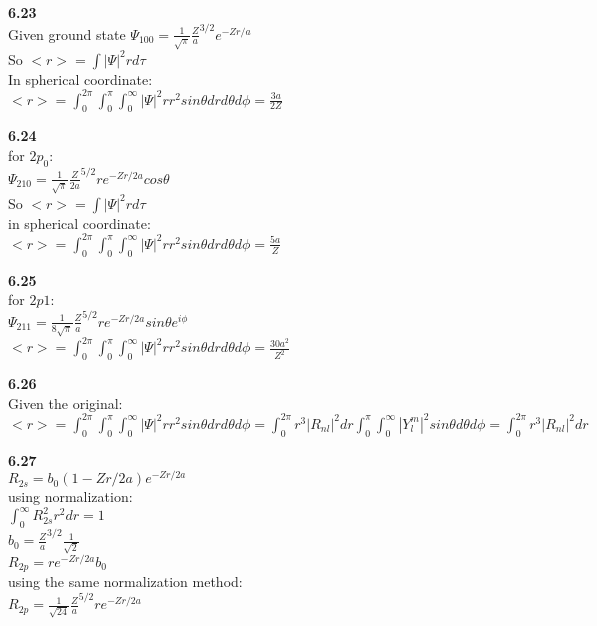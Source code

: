 \documentclass{article}
\begin{document}
\textbf{6.23}\\
Given ground state $\Psi_{100} = \frac{1}{\sqrt{\pi}}\frac{Z}{a}^{3/2}e^{-Zr/a}$\\
So $<r> = \int |\Psi|^2rd\tau$\\
In spherical coordinate:\\
$<r>=\int_0^{2\pi}\int_0^{\pi}\int_0^{\infty}|\Psi|^2rr^2sin\theta dr d\theta d\phi = \frac{3a}{2Z}$\\
\newline

\textbf{6.24}\\
for $2p_0$:\\
$\Psi_{210} = \frac{1}{\sqrt{\pi}}\frac{Z}{2a}^{5/2}re^{-Zr/2a}cos\theta$\\
So $<r> = \int |\Psi|^2r d\tau$\\
in spherical coordinate:\\
$<r>=\int_0^{2\pi}\int_0^{\pi}\int_0^{\infty}|\Psi|^2rr^2sin\theta dr d\theta d\phi = \frac{5a}{Z}$\\
\newline

\textbf{6.25}\\
for $2p1$:\\
$\Psi_{211} = \frac{1}{8\sqrt{\pi}}\frac{Z}{a}^{5/2}re^{-Zr/2a}sin\theta e^{i\phi}$\\
$<r>=\int_0^{2\pi}\int_0^{\pi}\int_0^{\infty}|\Psi|^2rr^2sin\theta dr d\theta d\phi = \frac{30a^2}{Z^2}$\\
\newline

\textbf{6.26}\\
Given the original:\\
$<r> = \int_0^{2\pi}\int_0^{\pi}\int_0^{\infty}|\Psi|^2rr^2sin\theta dr d\theta d\phi = \int_0^{2\pi} r^3|R_{nl}|^2dr\int_0^{\pi}\int_0^{\infty}|Y^m_l|^2sin\theta d\theta d\phi = \int_0^{2\pi} r^3|R_{nl}|^2dr$\\
\newline

\textbf{6.27}\\
$R_{2s} = b_0(1-Zr/2a)e^{-Zr/2a}$\\
using normalization:\\
$\int_0^{\infty}R_{2s}^2r^2dr = 1$\\
$b_0 = \frac{Z}{a}^{3/2}\frac{1}{\sqrt{2}}$\\
$R_{2p} = re^{-Zr/2a}b_0$\\
using the same normalization method:\\
$R_{2p} = \frac{1}{\sqrt{24}}\frac{Z}{a}^{5/2}re^{-Zr/2a}$\\
\newline
\end{document}
